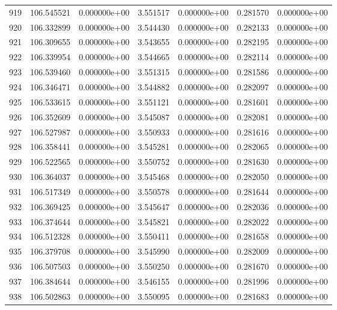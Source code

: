\begin{tabular}{rrrrrrr}
 919 & 106.545521 &  0.000000e+00 &  3.551517 &  0.000000e+00 &   0.281570 &  0.000000e+00 \\
 920 & 106.332899 &  0.000000e+00 &  3.544430 &  0.000000e+00 &   0.282133 &  0.000000e+00 \\
 921 & 106.309655 &  0.000000e+00 &  3.543655 &  0.000000e+00 &   0.282195 &  0.000000e+00 \\
 922 & 106.339954 &  0.000000e+00 &  3.544665 &  0.000000e+00 &   0.282114 &  0.000000e+00 \\
 923 & 106.539460 &  0.000000e+00 &  3.551315 &  0.000000e+00 &   0.281586 &  0.000000e+00 \\
 924 & 106.346471 &  0.000000e+00 &  3.544882 &  0.000000e+00 &   0.282097 &  0.000000e+00 \\
 925 & 106.533615 &  0.000000e+00 &  3.551121 &  0.000000e+00 &   0.281601 &  0.000000e+00 \\
 926 & 106.352609 &  0.000000e+00 &  3.545087 &  0.000000e+00 &   0.282081 &  0.000000e+00 \\
 927 & 106.527987 &  0.000000e+00 &  3.550933 &  0.000000e+00 &   0.281616 &  0.000000e+00 \\
 928 & 106.358441 &  0.000000e+00 &  3.545281 &  0.000000e+00 &   0.282065 &  0.000000e+00 \\
 929 & 106.522565 &  0.000000e+00 &  3.550752 &  0.000000e+00 &   0.281630 &  0.000000e+00 \\
 930 & 106.364037 &  0.000000e+00 &  3.545468 &  0.000000e+00 &   0.282050 &  0.000000e+00 \\
 931 & 106.517349 &  0.000000e+00 &  3.550578 &  0.000000e+00 &   0.281644 &  0.000000e+00 \\
 932 & 106.369425 &  0.000000e+00 &  3.545647 &  0.000000e+00 &   0.282036 &  0.000000e+00 \\
 933 & 106.374644 &  0.000000e+00 &  3.545821 &  0.000000e+00 &   0.282022 &  0.000000e+00 \\
 934 & 106.512328 &  0.000000e+00 &  3.550411 &  0.000000e+00 &   0.281658 &  0.000000e+00 \\
 935 & 106.379708 &  0.000000e+00 &  3.545990 &  0.000000e+00 &   0.282009 &  0.000000e+00 \\
 936 & 106.507503 &  0.000000e+00 &  3.550250 &  0.000000e+00 &   0.281670 &  0.000000e+00 \\
 937 & 106.384644 &  0.000000e+00 &  3.546155 &  0.000000e+00 &   0.281996 &  0.000000e+00 \\
 938 & 106.502863 &  0.000000e+00 &  3.550095 &  0.000000e+00 &   0.281683 &  0.000000e+00 \\

\end{tabular}
